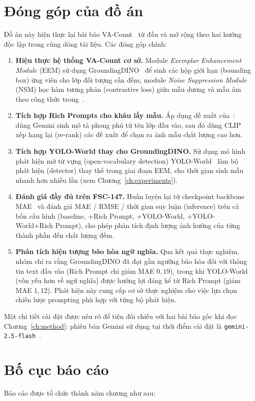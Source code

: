 \documentclass[a4paper,12pt]{report}
\numberwithin{figure}{chapter}
\numberwithin{table}{chapter}
\begin{document}
\section{Đóng góp của đồ án}
Đồ án này hiện thực lại bài báo VA-Count~\cite{vacount} từ đầu và mở rộng theo hai hướng độc lập trong cùng dòng tài liệu. Các đóng góp chính:

\begin{enumerate}
    \item \textbf{Hiện thực hệ thống VA-Count cơ sở.} Module \emph{Exemplar Enhancement Module} (EEM) sử dụng GroundingDINO~\cite{groundingdino} để sinh các hộp giới hạn (bounding box) ứng viên cho lớp đối tượng cần đếm; module \emph{Noise Suppression Module} (NSM) học hàm tương phản (contrastive loss) giữa mẫu dương và mẫu âm theo công thức trong~\cite{vacount}.
    \item \textbf{Tích hợp Rich Prompts cho khâu lấy mẫu.} Áp dụng đề xuất của~\cite{richprompts}: dùng Gemini sinh mô tả phong phú từ tên lớp đầu vào, sau đó dùng CLIP~\cite{clip} xếp hạng lại (re-rank) các đề xuất để chọn ra ảnh mẫu chất lượng cao hơn.
    \item \textbf{Tích hợp YOLO-World thay cho GroundingDINO.} Sử dụng mô hình phát hiện mở từ vựng (open-vocabulary detection) YOLO-World~\cite{yoloworld} làm bộ phát hiện (detector) thay thế trong giai đoạn EEM, cho thời gian sinh mẫu nhanh hơn nhiều lần (xem Chương~\ref{ch:experiments}).
    \item \textbf{Đánh giá đầy đủ trên FSC-147.} Huấn luyện lại từ checkpoint backbone MAE~\cite{mae} và đánh giá MAE / RMSE / thời gian suy luận (inference) trên cả bốn cấu hình (baseline, +Rich Prompt, +YOLO-World, +YOLO-World+Rich Prompt), cho phép phân tích định lượng ảnh hưởng của từng thành phần đến chất lượng đếm.
    \item \textbf{Phân tích hiện tượng bão hòa ngữ nghĩa.} Qua kết quả thực nghiệm, nhóm chỉ ra rằng GroundingDINO đã đạt gần ngưỡng bão hòa đối với thông tin text đầu vào (Rich Prompt chỉ giảm MAE $0{,}19$), trong khi YOLO-World (vốn yếu hơn về ngữ nghĩa) được hưởng lợi đáng kể từ Rich Prompt (giảm MAE $1{,}12$). Phát hiện này cung cấp cơ sở thực nghiệm cho việc lựa chọn chiến lược prompting phù hợp với từng bộ phát hiện.
\end{enumerate}
Một chi tiết cài đặt được nêu rõ để tiện đối chiếu với hai bài báo gốc khi đọc Chương~\ref{ch:method}: phiên bản Gemini sử dụng tại thời điểm cài đặt là \texttt{gemini-2.5-flash}~\cite{gemini}.

\section{Bố cục báo cáo}
Báo cáo được tổ chức thành năm chương như sau:
\end{document}

